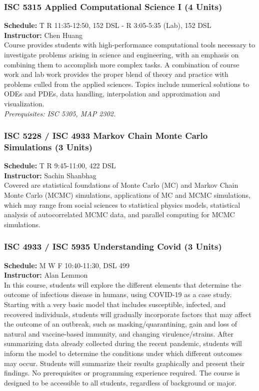 \documentclass[12pt,a4paper]{article}
\begin{document}
\subsubsection*{ISC 5315 Applied Computational Science I (4 Units)}
\textbf{Schedule:} T R 11:35-12:50, 152 DSL - R 3:05-5:35 (Lab), 152 DSL \\
\textbf{Instructor:} Chen Huang \\
Course provides students with high-performance computational tools necessary to investigate problems arising in science and engineering, with an emphasis on combining them to accomplish more complex tasks. A combination of course work and lab work provides the proper blend of theory and practice with problems culled from the applied sciences. Topics include numerical solutions to ODEs and PDEs, data handling, interpolation and approximation and visualization. \\
\textit{Prerequisites: ISC 5305, MAP 2302.}

\subsubsection*{ISC 5228 / ISC 4933 Markov Chain Monte Carlo Simulations (3 Units)}
\textbf{Schedule:} T R 9:45-11:00, 422 DSL \\
\textbf{Instructor:} Sachin Shanbhag \\
Covered are statistical foundations of Monte Carlo (MC) and Markov Chain Monte Carlo (MCMC) simulations, applications of MC and MCMC simulations, which may range from social sciences to statistical physics models, statistical analysis of autocorrelated MCMC data, and parallel computing for MCMC simulations.

\subsubsection*{ISC 4933 / ISC 5935 Understanding Covid (3 Units)}
\textbf{Schedule:} M W F 10:40-11:30, DSL 499 \\
\textbf{Instructor:} Alan Lemmon \\
In this course, students will explore the different elements that determine the outcome of infectious disease in humans, using COVID-19 as a case study. Starting with a very basic model that includes susceptible, infected, and recovered individuals, students will gradually incorporate factors that may affect the outcome of an outbreak, such as masking/quarantining, gain and loss of natural and vaccine-based immunity, and changing virulence/strains. After summarizing data already collected during the recent pandemic, students will inform the model to determine the conditions under which different outcomes may occur. Students will summarize their results graphically and present their findings. No prerequisites or programming experience required. The course is designed to be accessible to all students, regardless of background or major.
\end{document}
